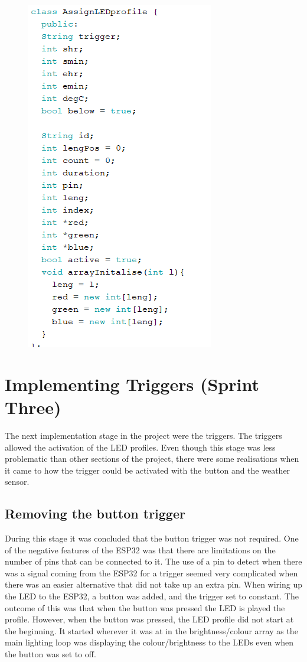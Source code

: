 \begin{figure}[h]
\centering
\includegraphics{ColourLEDProfile}
\end{figure}

\newpage

\section{Implementing Triggers (Sprint Three)}
The next implementation stage in the project were the triggers.  The triggers allowed the activation of the LED profiles. Even though this stage was less problematic than other sections of the project, there were some realisations when it came to how the trigger could be activated with the button and the weather sensor.

\subsection {Removing the button trigger}
During this stage it was concluded that the button trigger was not required. One of the negative features of the ESP32 was that there are limitations on the number of pins that can be connected to it. The use of a pin to detect when there was a signal coming from the ESP32 for a trigger seemed very complicated when there was an easier alternative that did not take up an extra pin. When wiring up the LED to the ESP32, a button was added, and the trigger set to constant. The outcome of this was that when the button was pressed the LED is played the profile. However, when the button was pressed, the LED profile did not start at the beginning. It started wherever it was at in the brightness/colour array as the main lighting loop was displaying the colour/brightness to the LEDs even when the button was set to off.

